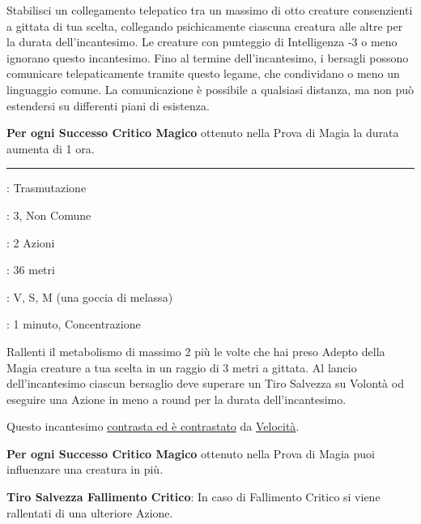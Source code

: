 \begin{multicols}{2}
Stabilisci un collegamento telepatico tra un massimo di otto creature consenzienti a gittata di tua scelta, collegando psichicamente ciascuna creatura alle altre per la durata dell'incantesimo. Le creature con punteggio di Intelligenza -3 o meno ignorano questo incantesimo. Fino al termine dell'incantesimo, i bersagli possono comunicare telepaticamente tramite questo legame, che condividano o meno un linguaggio comune. La comunicazione è possibile a qualsiasi distanza, ma non può estendersi su differenti piani di esistenza.

\textbf{Per ogni Successo Critico Magico} ottenuto nella Prova di Magia la durata aumenta di 1 ora.

\smallskip\noindent\rule{\linewidth}{2pt} \hypertarget{Lentezza}{}\smallskip{}\hypertarget{lentezza}{}
\noindent
\begin{description}[noitemsep, topsep=0pt, parsep=0pt, partopsep=0pt, leftmargin=0cm, labelwidth=2.8cm]
	\item[\textbf{Lista di Magia}]: Trasmutazione
	\item[\textbf{Livello}]: 3, Non Comune
	\item[\textbf{T. di Lancio}]: 2 Azioni
	\item[\textbf{Gittata}]: 36 metri
	\item[\textbf{Componenti}]: V, S, M (una goccia di melassa)
	\item[\textbf{Durata}]: 1 minuto, Concentrazione
\end{description}

Rallenti il metabolismo di massimo 2 più le volte che hai preso Adepto della Magia creature a tua scelta in un raggio di 3 metri a gittata. Al lancio dell'incantesimo ciascun bersaglio deve superare un Tiro Salvezza su Volontà od eseguire una Azione in meno a round per la durata dell'incantesimo.

Questo incantesimo \hyperlink{contrastareincantesimi}{contrasta ed è contrastato} da \hyperlink{Velocità}{Velocità}.

\textbf{Per ogni Successo Critico Magico} ottenuto nella Prova di Magia puoi influenzare una creatura in più.

\textbf{Tiro Salvezza Fallimento Critico}: In caso di Fallimento Critico si viene rallentati di una ulteriore Azione.


\end{multicols}
